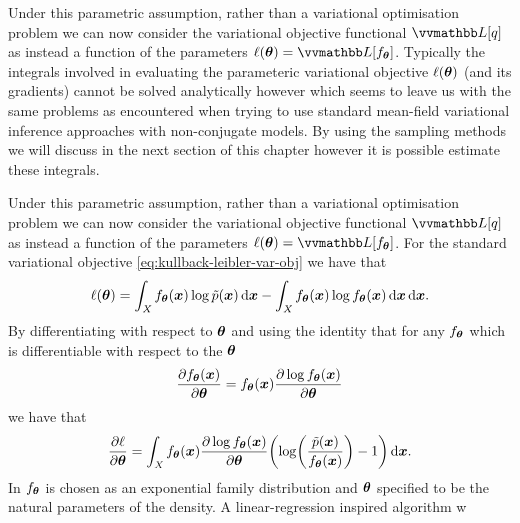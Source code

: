 Under this parametric assumption, rather than a variational optimisation problem we can now consider the variational objective functional $\varobj[q]$ as instead a function of the parameters $\ell(\vct{\theta}) = \varobj[f_{\vct{\theta}}]$. Typically the integrals involved in evaluating the parameteric variational objective $\ell(\boldsymbol{\theta})$ (and its gradients) cannot be solved analytically however which seems to leave us with the same problems as encountered when trying to use standard mean-field variational inference approaches with non-conjugate models. By using the sampling methods we will discuss in the next section of this chapter however it is possible estimate these integrals.

Under this parametric assumption, rather than a variational optimisation problem we can now consider the variational objective functional $\varobj[q]$ as instead a function of the parameters $\ell(\vct{\theta}) = \varobj[f_{\vct{\theta}}]$. For the standard variational objective \eqref{eq:kullback-leibler-var-obj} we have that
\begin{equation}\label{eq:kl-var-obj-parameteric}
  \ell(\boldsymbol{\theta}) = 
  \int_{\mathit{X}} f_{\boldsymbol{\theta}}(\boldsymbol{x}) \log\tilde{p}(\boldsymbol{x}) \,\mathrm{d}\boldsymbol{x} -
  \int_{\mathit{X}}  f_{\boldsymbol{\theta}}(\boldsymbol{x}) \log f_{\boldsymbol{\theta}}(\boldsymbol{x})  \,\mathrm{d}\boldsymbol{x}
  \,\mathrm{d}\boldsymbol{x}.
\end{equation}
By differentiating with respect to $\boldsymbol{\theta}$ and using the identity that for any $f_{\boldsymbol{\theta}}$ which is differentiable with respect to the $\boldsymbol{\theta}$
\begin{equation}\label{eq:log-derivative-identity}
  \frac{\partial f_{\boldsymbol{\theta}}(\boldsymbol{x})}{\partial \boldsymbol{\theta}} = 
  f_{\boldsymbol{\theta}}(\boldsymbol{x}) \frac{\partial \log f_{\boldsymbol{\theta}}(\boldsymbol{x})}{\partial \boldsymbol{\theta}}
\end{equation} 
we have that
\begin{equation}\label{eq:kl-var-obj-parameteric-gradient}
  \pd{\ell}{\vct{\theta}} = 
  \int_{\set{X}} f_{\vct{\theta}}(\vct{x}) \pd{\log f_{\vct{\theta}}(\vct{x})}{\vct{\theta}} \lpa \log\lpa \frac{\utgtdens(\vct{x})}{f_{\vct{\theta}}(\vct{x})}\rpa -1 \rpa \,\dr\vct{x}.
\end{equation}
In \cite{salimans2013fixed} $f_{\boldsymbol{\theta}}$ is chosen as an exponential family distribution and $\boldsymbol{\theta}$ specified to be the natural parameters of the density. A linear-regression inspired algorithm w

